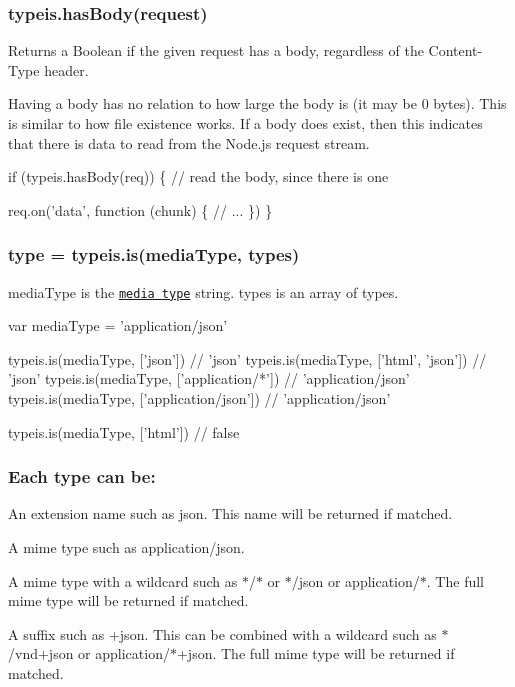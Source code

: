 \subsubsection*{typeis.\+has\+Body(request)}

Returns a Boolean if the given {\ttfamily request} has a body, regardless of the {\ttfamily Content-\/\+Type} header.

Having a body has no relation to how large the body is (it may be 0 bytes). This is similar to how file existence works. If a body does exist, then this indicates that there is data to read from the Node.\+js request stream.


\begin{DoxyCode}
if (typeis.hasBody(req)) \{
  // read the body, since there is one

  req.on('data', function (chunk) \{
    // ...
  \})
\}
\end{DoxyCode}


\subsubsection*{type = typeis.\+is(media\+Type, types)}

{\ttfamily media\+Type} is the \href{https://tools.ietf.org/html/rfc6838}{\tt media type} string. {\ttfamily types} is an array of types.


\begin{DoxyCode}
var mediaType = 'application/json'

typeis.is(mediaType, ['json'])             // 'json'
typeis.is(mediaType, ['html', 'json'])     // 'json'
typeis.is(mediaType, ['application/*'])    // 'application/json'
typeis.is(mediaType, ['application/json']) // 'application/json'

typeis.is(mediaType, ['html']) // false
\end{DoxyCode}


\subsubsection*{Each type can be\+:}


\begin{DoxyItemize}
\item An extension name such as {\ttfamily json}. This name will be returned if matched.
\item A mime type such as {\ttfamily application/json}.
\item A mime type with a wildcard such as {\ttfamily $\ast$/$\ast$} or {\ttfamily $\ast$/json} or {\ttfamily application/$\ast$}. The full mime type will be returned if matched.
\item A suffix such as {\ttfamily +json}. This can be combined with a wildcard such as {\ttfamily $\ast$/vnd+json} or {\ttfamily application/$\ast$+json}. The full mime type will be returned if matched.
\end{DoxyItemize}

